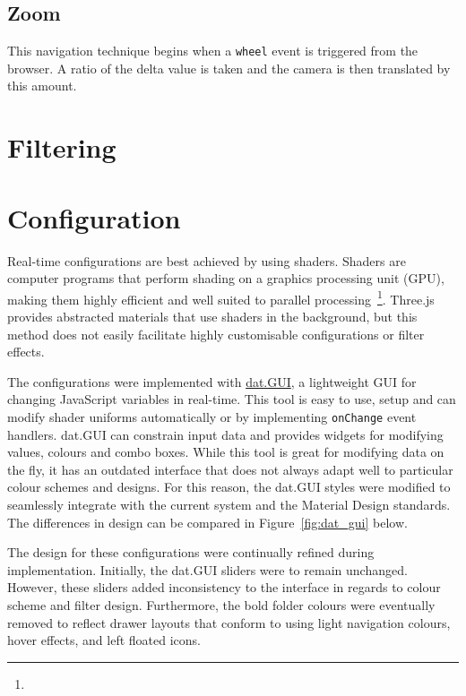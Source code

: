 {{		
	
	}

	\subsection{Zoom} {
	\label{sec:zoom}

		This navigation technique begins when a \texttt{wheel} event is triggered from the browser. A ratio of the delta value is taken and the camera is then translated by this amount.
	
	}

}

\section{Filtering} {
\label{sec:filtering_implementation}


}

\section{Configuration} {
\label{sec:configuration_implementation}

	Real-time configurations are best achieved by using shaders. Shaders are computer programs that perform shading on a graphics processing unit (GPU), making them highly efficient and well suited to parallel processing~\footnote{}. Three.js provides abstracted materials that use shaders in the background, but this method does not easily facilitate highly customisable configurations or filter effects.

	The configurations were implemented with \href{http://workshop.chromeexperiments.com/}{dat.GUI}, a lightweight GUI for changing JavaScript variables in real-time. This tool is easy to use, setup and can modify shader uniforms automatically or by implementing \texttt{onChange} event handlers. dat.GUI can constrain input data and provides widgets for modifying values, colours and combo boxes. While this tool is great for modifying data on the fly, it has an outdated interface that does not always adapt well to particular colour schemes and designs. For this reason, the dat.GUI styles were modified to seamlessly integrate with the current system and the Material Design standards. The differences in design can be compared in Figure~\ref{fig:dat_gui} below.

	

	The design for these configurations were continually refined during implementation. Initially, the dat.GUI sliders were to remain unchanged. However, these sliders added inconsistency to the interface in regards to colour scheme and filter design. Furthermore, the bold folder colours were eventually removed to reflect drawer layouts that conform to using light navigation colours, hover effects, and left floated icons.

}

